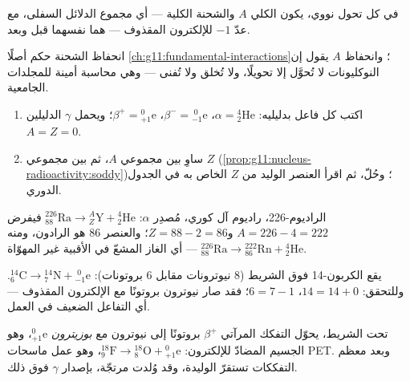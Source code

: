 \begin{proposition}\label{prop:g11:nucleus-radioactivity:soddy}
في كل تحول نووي، يكون  الكلي $A$ والشحنة
الكلية --- أي مجموع الدلائل السفلى، مع عدّ $-1$ للإلكترون
المقذوف --- هما نفسهما قبل وبعد.
\end{proposition}
\admitted

\begin{remark}
انحفاظ الشحنة حكم أصلًا \cref{ch:g11:fundamental-interactions}؛
وانحفاظ $A$ يقول إن النوكليونات لا تُحوَّل إلا تحويلًا، ولا تُخلق ولا
تُفنى --- وهي محاسبة أمينة للمجلدات الجامعية.
\end{remark}

\begin{method}\label{met:g11:nucleus-radioactivity:balance}
\begin{enumerate}
  \item اكتب كل فاعل بدليليه: $\alpha = {}^{4}_{2}\mathrm{He}$،
        $\beta^- = {}^{\;0}_{-1}\mathrm{e}$، $\beta^+ = {}^{0}_{+1}\mathrm{e}$؛ ويحمل $\gamma$ الدليلين $A = Z = 0$.
  \item ساوِ بين مجموعي $A$، ثم بين مجموعي $Z$
        (\cref{prop:g11:nucleus-radioactivity:soddy})؛ وحُلّ، ثم اقرأ
        العنصر الوليد من $Z$ الخاص به في الجدول الدوري.
\end{enumerate}
\end{method}

\begin{example}\label{ex:g11:nucleus-radioactivity:alpha}
الراديوم-226، راديوم آل كوري، مُصدِر $\alpha$:
${}^{226}_{88}\mathrm{Ra} \to {}^{A}_{Z}\mathrm{Y} + {}^{4}_{2}\mathrm{He}$
فيفرض $A = 226 - 4 = 222$ و$Z = 88 - 2 = 86$؛ والعنصر $86$ هو الرادون، ومنه
${}^{226}_{88}\mathrm{Ra} \to {}^{222}_{86}\mathrm{Rn} + {}^{4}_{2}\mathrm{He}$
--- أي الغاز المشعّ في الأقبية غير المهوّاة.
\end{example}

\begin{example}\label{ex:g11:nucleus-radioactivity:beta}
يقع الكربون-14 فوق الشريط ($8$ نيوترونات مقابل $6$ بروتونات):
${}^{14}_{6}\mathrm{C} \to {}^{14}_{7}\mathrm{N} + {}^{\;0}_{-1}\mathrm{e}$.
وللتحقق: $14 = 14 + 0$، $6 = 7 - 1$؛ فقد صار نيوترون بروتونًا مع
الإلكترون المقذوف --- أي التفاعل الضعيف في العمل.
\end{example}

\begin{remark}\label{rem:g11:nucleus-radioactivity:betaplus}
تحت الشريط، يحوّل التفكك المرآتي $\beta^+$ بروتونًا إلى نيوترون
مع \emph{بوزيترون} ${}^{0}_{+1}\mathrm{e}$، وهو الجسيم المضادّ للإلكترون:
${}^{18}_{9}\mathrm{F} \to {}^{18}_{8}\mathrm{O} + {}^{0}_{+1}\mathrm{e}$،
وهو  عمل ماسحات PET. وبعد معظم التفككات تستقرّ الوليدة، وقد وُلدت مرتجّة،
بإصدار $\gamma$ فوق ذلك.
\end{remark}

